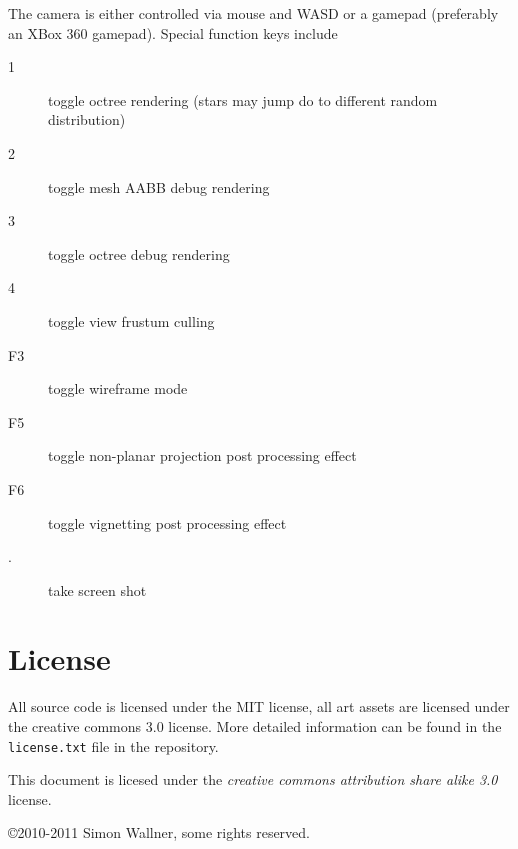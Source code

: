 \documentclass[a4, 12pt]{scrartcl}
\begin{document}
The camera is either controlled via mouse and WASD or a gamepad (preferably an XBox 360 gamepad). Special function keys include
\begin{description}
\item[1] toggle octree rendering (stars may jump do to different random distribution)
\item[2] toggle mesh AABB debug rendering
\item[3] toggle octree debug rendering
\item[4] toggle view frustum culling

\item[F3] toggle wireframe mode
\item[F5] toggle non-planar projection post processing effect
\item[F6] toggle vignetting post processing effect

\item[.] take screen shot

\end{description}

\section{License}
All source code is licensed under the MIT license, all art assets are licensed under the creative commons 3.0 license. More detailed information can be found in the \texttt{license.txt} file in the repository.

This document is licesed under the \emph{creative commons attribution share alike 3.0} license.

\copyright 2010-2011 Simon Wallner, some rights reserved. 
\end{document}

